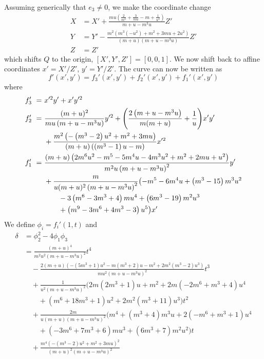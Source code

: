 \documentclass[11pt, a4paper]{article}
\numberwithin{equation}{section}
\begin{document}
Assuming generically that $e_3 \neq 0$, we make the coordinate change
\begin{align}
  X &= X' + \frac{m u \left(\frac{2}{m^2}+\frac{3}{m u}-m+\frac{1}{u^2}\right)}{m+u-m^3 u} Z' \\
  Y &= Y' - \frac{m^2 \left(m^3 \left(-u^2\right)+m^2+3 m u+2 u^2\right)}{(m+u) \left(m+u-m^3 u\right)} Z' \\
  Z &= Z'
\end{align}
which shifts $Q$ to the origin, $[X', Y', Z'] = [0, 0, 1]$. We now shift back to affine coordinates $x' = X'/Z'$, $y' = Y'/Z'$. The curve can now be written as
\begin{equation}
  f'(x', y') = f_3'(x', y') + f_2'(x', y') + f_1'(x', y')
\end{equation}
where
\begin{align}
  f_3' \ = \ & x'^2 y' + x' y'^2 \\
  f_2' \ = \ & \frac{(m+u)^2}{m u \left(m+u-m^3 u\right)} y'^2 + \qty(\frac{2 \left(m+u-m^3 u\right)}{m (m+u)}+\frac{1}{u}) x' y' \notag \\
  & + \frac{m^2 \left(-\left(m^3-2\right) u^2+m^2+3 m u\right)}{(m+u) \left(\left(m^3-1\right) u-m\right)} x'^2 \\
  f_1' \ = \ & \frac{(m+u) \left(2 m^6 u^2-m^5-5 m^4 u-4 m^3 u^2+m^2+2 m u+u^2\right)}{m^2 u \left(m+u-m^3 u\right)^2} y' \notag \\
  & + \frac{m}{u (m+u)^2 \left(m+u-m^3 u\right)^2} \bigl( -m^5-6 m^4 u+\left(m^3-15\right) m^3 u^2 \notag \\
  & \qquad -3 \left(m^6-3 m^3+4\right) m u^4+\left(6 m^3-19\right) m^2 u^3 \notag \\
  & \qquad +\left(m^9-3 m^6+4 m^3-3\right) u^5 \bigr) x'
\end{align}
We define $\phi_i = f_i'(1, t)$ and
\begin{equation}
  \begin{split}
    \delta &= \phi_2^2 - 4 \phi_1 \phi_3 \\
    &= \frac{(m+u)^4}{m^2 u^2 \left(m+u-m^3 u\right)^2} t^4 \\
    & \quad - \frac{2 (m+u) \left(-\left(5 m^3+1\right) u^2-m \left(m^3+2\right) u-m^2+2 m^2 \left(m^3-2\right) u^3\right)}{m u^2 \left(m+u-m^3 u\right)^2} t^3 \\
    & \quad + \frac{1}{u^2 \left(m+u-m^3 u\right)^2} \bigl( 2 m \left(2 m^3+1\right) u+m^2+2 m \left(-2 m^6+m^3+4\right) u^4 \\
    & \qquad +\left(m^6+18 m^3+1\right) u^2+2 m^2 \left(m^3+11\right) u^3 \bigr) t^2 \\
    & \quad + \frac{2 m}{u (m+u) \left(m+u-m^3 u\right)^2} \bigl( m^4+\left(m^3+4\right) m^3 u+2 \left(-m^6+m^3+1\right) u^4 \\
    & \qquad +\left(-3 m^6+7 m^3+6\right) m u^3+\left(6 m^3+7\right) m^2 u^2 \bigr) t \\
    & \quad + \frac{m^4 \left(-\left(m^3-2\right) u^2+m^2+3 m u\right)^2}{(m+u)^2 \left(m+u-m^3 u\right)^2}
  \end{split}
\end{equation}
\end{document}
